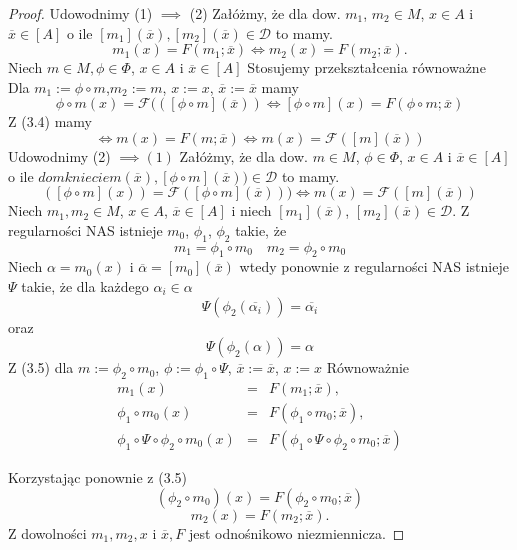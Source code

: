 \documentclass[12pt,a4paper]{report}
\newcommand{\domkniecie}[1]{\left\lbrack{#1}\right\rbrack}
\begin{document}
\begin{proof}
Udowodnimy (1) $\implies$ (2)
Załóżmy, że dla dow. $m_{1}$, $ m_{2} \in M$, $x \in A$ i $\overline{x} \in \domkniecie{A}$ o ile $\domkniecie{m_1}(\overline{x}), \domkniecie{m_2}(\overline{x})\in \mathcal{D}$ to mamy.
\begin{equation}
 m_{1}(x)=F(m_{1};\overline{x}) \iff m_{2}(x)=F(m_{2};\overline{x}).
\end{equation}
Niech $m\in M, \phi \in \Phi$, $x \in A$ i $\overline{x}\in \domkniecie{A}$
Stosujemy przekształcenia równoważne
Dla $m_1:=\phi\circ m$,$ m_2:=m$, $x:=x$, $\overline{x}:=\overline{x}$ mamy
$$
\phi\circ m(x)=\mathcal{F}((\domkniecie{\phi \circ m}(\overline{x})) \iff \domkniecie{\phi \circ m}(x)=F(\phi \circ m;\overline{x}) 
$$
Z (3.4) mamy
$$
\iff m(x)=F(m;\overline{x}) \iff m(x)=\mathcal{F}(\domkniecie{m}(\overline{x}))
$$
Udowodnimy (2) $\implies (1)$
Załóżmy, że dla dow. $m \in M$, $\phi \in \Phi$, $ x \in A$ i $\overline{x} \in \domkniecie{A}$ o ile $domkniecie{m}(\overline{x}), \domkniecie{\phi\circ m}(\overline{x})) \in \mathcal{D}$ to mamy.
\begin{equation}
(\domkniecie{\phi\circ m}(x))=\mathcal{F}( \domkniecie{\phi \circ m}(\overline{x}))) \iff m(x)=\mathcal{F}(\domkniecie{m}(\overline{x}))
\end{equation}
Niech $m_1,m_2 \in M$, $x \in A$, $\overline{x}\in \domkniecie{A}$ i niech $\domkniecie{m_1}(\overline{x})$, $\domkniecie{m_2}(\overline{x})\in \mathcal{D}$. Z regularności NAS istnieje $m_0$, $\phi_1$, $\phi_2$ takie, że
$$ 
m_1=\phi_1\circ m_0 \quad m_2=\phi_2\circ m_0
$$
Niech $\alpha=m_0(x)$ i $\overline{\alpha}=\domkniecie{m_0}(\overline{x})$ wtedy ponownie z regularności NAS istnieje $\Psi$ takie, że dla każdego $\alpha_i \in \alpha$
$$
\Psi(\phi_2(\overline{\alpha_i}))=\overline{\alpha_i}
$$
oraz
$$
\Psi(\phi_2(\alpha))=\alpha
$$
Z (3.5) dla $m:=\phi_2 \circ m_0$, $\phi:=\phi_1\circ \Psi$, $\overline{x}:=\overline{x}$, $x:=x$
Równoważnie
\begin{eqnarray*}
m_1(x) & = & F(m_1;\overline{x}), \\
 \phi_1\circ m_0(x) & = & F(\phi_1 \circ m_0;\overline{x}),\\
\phi_1\circ\Psi\circ\phi_2\circ m_0(x)&=&F(\phi_1\circ\Psi\circ\phi_2\circ m_0;\overline{x}) 
\end{eqnarray*}

Korzystając ponownie z (3.5)
$$
(\phi_2\circ m_0)(x)=F(\phi_2\circ m_0;\overline{x}) 
$$
$$
m_2(x)=F(m_2;\overline{x}).
$$
Z dowolności $m_1, m_2, x$ i $\overline{x}, F$ jest odnośnikowo niezmiennicza.


\end{proof}
\end{document}
